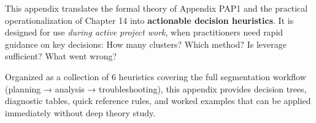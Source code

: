 \vspace{1em}


\begin{tcolorbox}[colback=blue!5!white, colframe=blue!75!black,
    title=Abstract]

This appendix translates the formal theory of Appendix PAP1 and the practical operationalization of Chapter 14 into \textbf{actionable decision heuristics}. It is designed for use \textit{during active project work}, when practitioners need rapid guidance on key decisions: How many clusters? Which method? Is leverage sufficient? What went wrong?

Organized as a collection of 6 heuristics covering the full segmentation workflow (planning → analysis → troubleshooting), this appendix provides decision trees, diagnostic tables, quick reference rules, and worked examples that can be applied immediately without deep theory study.

\end{tcolorbox}

\vspace{1em}



